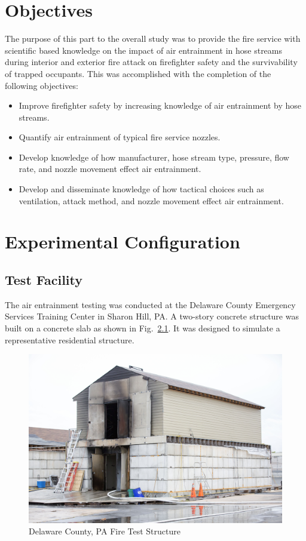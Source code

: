 \documentclass[12pt,oneside]{book}
\begin{document}
\chapter{Objectives}

The purpose of this part to the overall study was to provide the fire service with scientific based knowledge on the impact of air entrainment in hose streams during interior and exterior fire attack on firefighter safety and the survivability of trapped occupants. This was accomplished with the completion of the following objectives:

\begin{itemize}
	\item Improve firefighter safety by increasing knowledge of air entrainment by hose streams.
	\item Quantify air entrainment of typical fire service nozzles. 
	\item Develop knowledge of how manufacturer, hose stream type, pressure, flow rate, and nozzle movement effect air entrainment.
	\item Develop and disseminate knowledge of how tactical choices such as ventilation, attack method, and nozzle movement effect air entrainment. 
	\end{itemize}


\chapter{Experimental Configuration}

\section{Test Facility}

The air entrainment testing was conducted at the Delaware County Emergency Services Training Center in Sharon Hill, PA. A two-story concrete structure was built on a concrete slab as shown in Fig.~\ref{fig:Delaware_County,_PA_Fire_Test_Structure}. It was designed to simulate a representative residential structure. 

\begin{figure}[!ht]
	\centering
	\includegraphics[width=\columnwidth]{Figures/Air_Entrainment/delcocorner.jpg}
	\caption{Delaware County, PA Fire Test Structure}
	\label{fig:Delaware_County,_PA_Fire_Test_Structure}
\end{figure}
\end{document}
